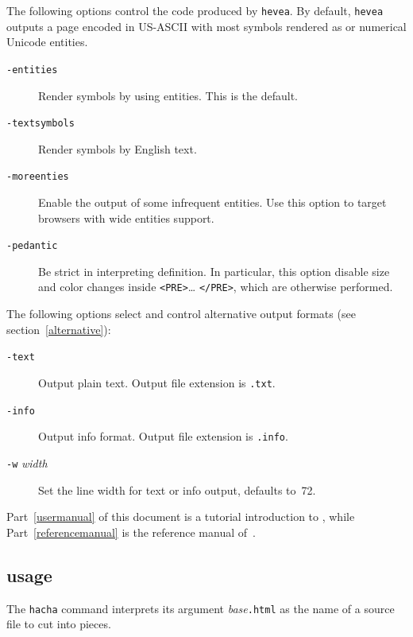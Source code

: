 The following options control the {\html} code produced by
\texttt{hevea}. By default, \texttt{hevea} outputs a page encoded in
US-ASCII with most symbols rendered as {\html} or numerical Unicode
entities.
\begin{description}
\item[{\tt -entities}] Render symbols by using entities. This is the default.
\item[{\tt -textsymbols}] Render symbols by English text.
\item[{\tt -moreenties}] Enable the output of some infrequent entities. Use
this option to target browsers with wide entities support.
\item[{\tt -pedantic}]  Be strict in interpreting \html{}
definition. In particular, this option disable size and color changes inside
\verb+<PRE>+\ldots{} \verb+</PRE>+, which are otherwise performed.
\end{description}

The following options select and control alternative output formats
(see section~\ref{alternative}):
\begin{description}
\item[{\tt -text}] Output plain text. Output file
extension is \texttt{.txt}.
\item[{\tt -info}] Output info format. Output file extension
is \texttt{.info}.
\item[{\tt -w} {\it width}] Set the line width for text or info
output, defaults to~72.
\end{description}

Part~\ref{usermanual} of this document is
a tutorial introduction to \hevea{},
while Part~\ref{referencemanual} is the reference manual of~\hevea.


\subsection{\hacha{} usage}
The \texttt{hacha} command interprets its argument
\textit{base}\texttt{.html} as the name of
a \html{} source file to cut into pieces.

